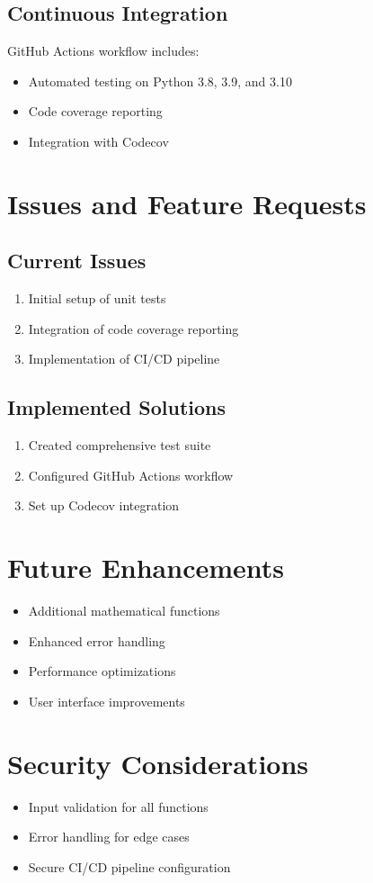 \documentclass{article}
\begin{document}
\subsection{Continuous Integration}
GitHub Actions workflow includes:
\begin{itemize}
    \item Automated testing on Python 3.8, 3.9, and 3.10
    \item Code coverage reporting
    \item Integration with Codecov
\end{itemize}

\section{Issues and Feature Requests}
\subsection{Current Issues}
\begin{enumerate}
    \item Initial setup of unit tests
    \item Integration of code coverage reporting
    \item Implementation of CI/CD pipeline
\end{enumerate}

\subsection{Implemented Solutions}
\begin{enumerate}
    \item Created comprehensive test suite
    \item Configured GitHub Actions workflow
    \item Set up Codecov integration
\end{enumerate}

\section{Future Enhancements}
\begin{itemize}
    \item Additional mathematical functions
    \item Enhanced error handling
    \item Performance optimizations
    \item User interface improvements
\end{itemize}

\section{Security Considerations}
\begin{itemize}
    \item Input validation for all functions
    \item Error handling for edge cases
    \item Secure CI/CD pipeline configuration
\end{itemize}
\end{document}
